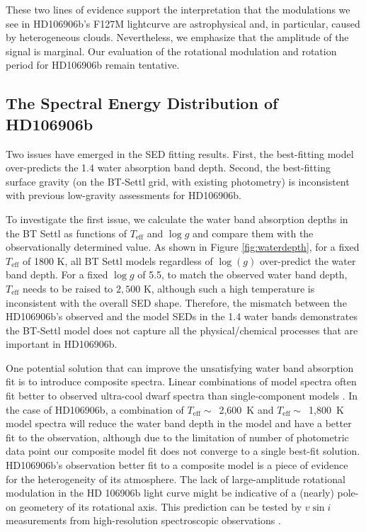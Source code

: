 \documentclass[twocolumn]{aastex62}
\newcommand{\teff}{\ensuremath{T_{\mathrm{eff}}}\xspace}
\newcommand{\logg}{\ensuremath{\log(g)}\xspace}
\begin{document}
These two lines of evidence support the interpretation that the modulations we see in HD106906b's F127M lightcurve are astrophysical and, in particular, caused by heterogeneous clouds. Nevertheless, we emphasize that the amplitude of the signal is marginal. Our evaluation of the rotational modulation and rotation period for HD106906b remain {tentative}.


\subsection{The Spectral Energy Distribution of  HD106906b}
Two issues have emerged in the SED fitting results. First, the best-fitting model over-predicts the 1.4 \micron{} water absorption band depth. Second, the best-fitting surface gravity (on the BT-Settl grid, with existing photometry) is inconsistent with previous low-gravity assessments for HD106906b.

To investigate the first issue, we calculate the water band absorption depths in the BT Settl as functions of $T_{\mathrm{eff}}$ and $\log g$ and compare them with the {observationally determined} value. As shown in Figure \ref{fig:waterdepth}, for a fixed $T_{\mathrm{eff}}$ of 1800 K, all BT Settl models regardless of \logg{} over-predict the water band depth. For a fixed $\log g$ of 5.5, to match the observed water band depth, $T_{\mathrm{eff}}$ needs to be raised to $2,500$ K, although such a high temperature is {inconsistent} with the overall SED shape. Therefore, the mismatch between the HD106906b's observed and the model SEDs in the 1.4 \micron{} water bands demonstrates the BT-Settl model does not capture all the physical/chemical processes that are important in HD106906b.

One potential solution that can improve the unsatisfying water band absorption fit is to introduce composite spectra. Linear combinations of model spectra often fit better to observed ultra-cool dwarf spectra than single-component models \citep[e.g.,][]{Marley2010,Apai2013}. In the case of HD106906b, a combination of $\teff\sim$~2,600~K and $\teff\sim$~1,800~K model spectra will reduce the water band depth in the model and have a better fit to the observation, although due to the limitation of number of photometric data point our composite model fit does not converge to {a single} best-fit solution. HD106906b's observation better fit to a composite model is a piece of evidence for the heterogeneity of its atmosphere. {The lack of large-amplitude rotational modulation in the HD 106906b light curve might be indicative of a (nearly) pole-on geometery of its rotational axis.}
This prediction can be tested by $v\sin i$ measurements from high-resolution spectroscopic observations \citep[e.g.,][]{Snellen2014,Vos2017b,Bryan2018}.
\end{document}
